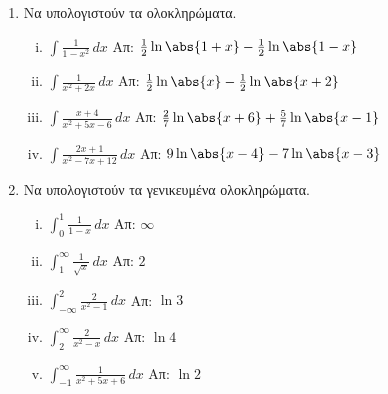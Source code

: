 \documentclass[a4paper,table]{report}
\begin{document}
\begin{enumerate}
  \item Να υπολογιστούν τα ολοκληρώματα.
    \begin{enumerate}[i)]
      \item $ \int \frac{1}{1-x^{2}} \,{dx} $ \hfill Απ: $ \frac{1}{2} \ln{\abs{1+x} - 
        \frac{1}{2} \ln{\abs{1-x}}} $
      \item $ \int \frac{1}{x^{2}+2x} \,{dx} $ \hfill Απ: $ \frac{1}{2} \ln{\abs{x}} -
        \frac{1}{2} \ln{\abs{x+2}} $ 
      \item $ \int \frac{x+4}{x^{2}+5x-6} \,{dx} $ \hfill Απ: $ \frac{2}{7}
        \ln{\abs{x+6}} + \frac{5}{7} \ln{\abs{x-1}} $
      \item $ \int \frac{2x+1}{x^{2}-7x+12} \,{dx} $ \hfill Απ: $ 9 \ln{\abs{x-4}} - 7
        \ln{\abs{x-3}} $ 
    \end{enumerate}

  \item Να υπολογιστούν τα γενικευμένα ολοκληρώματα.
    \begin{enumerate}[i)]
      \item $ \int _{0}^{1} \frac{1}{1-x} \,{dx} $ \hfill Απ: $ \infty $ 
      \item $ \int _{1}^{\infty} \frac{1}{\sqrt{x}} \,{dx} $ \hfill Απ: $2$ 
      \item $ \int _{- \infty}^{2} \frac{2}{x^{2}-1} \,{dx} $ \hfill Απ: $ \ln{3}$ 
      \item $ \int _{2}^{\infty} \frac{2}{x^{2}-x} \,{dx} $ \hfill Απ: $ \ln{4}$ 
      \item $ \int _{-1}^{\infty} \frac{1}{x^{2}+5x+6} \,{dx} $ \hfill Απ: $ \ln{2}$ 
    \end{enumerate}
\end{enumerate}
\end{document}
